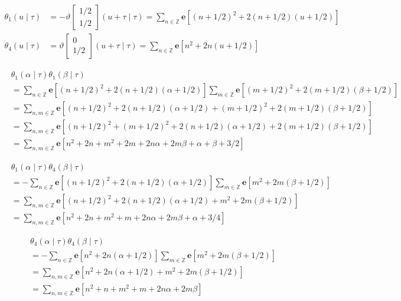 \documentclass[12pt,b5paper]{ltjsarticle}
\begin{document}
\begin{align}
 \theta_{1}(u\mid\tau)
  &=
  -\vartheta
  \begin{bmatrix}
   1/2 \\ 1/2
  \end{bmatrix}
  (u +\tau \mid \tau)
 = \sum_{n\in\mathbb{Z}}
  \mathbf{e}
  [(n + 1/2)^{2} + 2(n + 1/2)(u + 1/2)]
 \\
 \theta_{4}(u\mid\tau)
  &=
  \vartheta
  \begin{bmatrix}
   0 \\ 1/2
  \end{bmatrix}
  (u +\tau \mid \tau)
 = \sum_{n\in\mathbb{Z}}
  \mathbf{e}
  [n^{2} + 2n(u + 1/2)]
\end{align}

\dotfill

\begin{align}
 & \theta_{1}(\alpha\mid\tau)
 \theta_{1}(\beta\mid\tau)\\
 &=
 \sum_{n\in\mathbb{Z}}
 \mathbf{e}[(n + 1/2)^{2} + 2(n + 1/2)(\alpha + 1/2)]
 \sum_{m\in\mathbb{Z}}
 \mathbf{e}[(m + 1/2)^{2} + 2(m + 1/2)(\beta + 1/2)]
 \\
 &=
 \sum_{n,m\in\mathbb{Z}}
 \mathbf{e}[
 (n + 1/2)^{2} + 2(n + 1/2)(\alpha + 1/2)
 +
 (m + 1/2)^{2} + 2(m + 1/2)(\beta + 1/2)
 ]\\
 &=
 \sum_{n,m\in\mathbb{Z}}
 \mathbf{e}[
 (n + 1/2)^{2} + (m + 1/2)^{2}
 + 2(n + 1/2)(\alpha + 1/2)
 +
 2(m + 1/2)(\beta + 1/2)
 ]\\
 &=
 \sum_{n,m\in\mathbb{Z}}
 \mathbf{e}[
 n^{2} + 2n + m^{2} + 2m
 + 2n\alpha  + 2m\beta
 + \alpha + \beta + 3/2
 ]
\end{align}

\begin{align}
 & \theta_{1}(\alpha\mid\tau)
 \theta_{4}(\beta\mid\tau)\\
 &= -
 \sum_{n\in\mathbb{Z}}
 \mathbf{e}[(n + 1/2)^{2} + 2(n + 1/2)(\alpha + 1/2)]
 \sum_{m\in\mathbb{Z}}
 \mathbf{e}[m^{2} + 2m(\beta + 1/2)]
 \\
 &=
 \sum_{n,m\in\mathbb{Z}}
 \mathbf{e}[
 (n + 1/2)^{2} + 2(n + 1/2)(\alpha + 1/2)
 +
 m^{2} + 2m(\beta + 1/2)
 ]\\
 &=
 \sum_{n,m\in\mathbb{Z}}
 \mathbf{e}[
 n^{2} + 2n + m^{2} + m
 + 2n\alpha  + 2m\beta
 + \alpha + 3/4
 ]
\end{align}


\begin{align}
 & \theta_{4}(\alpha\mid\tau)
 \theta_{4}(\beta\mid\tau)\\
 &= -
 \sum_{n\in\mathbb{Z}}
 \mathbf{e}[n^{2} + 2n(\alpha + 1/2)]
 \sum_{m\in\mathbb{Z}}
 \mathbf{e}[m^{2} + 2m(\beta + 1/2)]
 \\
 &=
 \sum_{n,m\in\mathbb{Z}}
 \mathbf{e}[
 n^{2} + 2n(\alpha + 1/2)
 +
 m^{2} + 2m(\beta + 1/2)
 ]\\
 &=
 \sum_{n,m\in\mathbb{Z}}
 \mathbf{e}[
 n^{2} + n + m^{2} + m
 + 2n\alpha  + 2m\beta
 ]
\end{align}


\hrulefill
\end{document}
